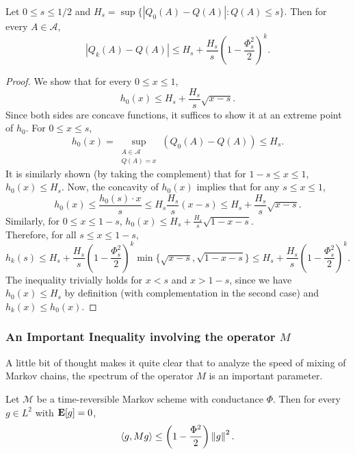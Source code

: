 \begin{corollary}
    Let $0\leq s\leq 1/2$ and $H_s=\sup\{|Q_0(A)-Q(A)|:Q(A)\leq s\}$. Then for every $A\in\mathcal{A}$,
    \[|Q_k(A)-Q(A)| \leq H_s + \frac{H_s}{s}\left(1-\frac{\Phi_s^2}{2}\right)^k. \]
\end{corollary}
\begin{proof}
    We show that for every $0\leq x\leq 1$,
    \[ h_0(x) \leq H_s + \frac{H_s}{s}\sqrt{x-s}. \]
    Since both sides are concave functions, it suffices to show it at an extreme point of $h_0$. For $0\leq x\leq s$,
    \[ h_0(x) = \sup_{\substack{A\in\mathcal{A} \\ Q(A)=x}} (Q_0(A)-Q(A)) \leq H_s. \]
    It is similarly shown (by taking the complement) that for $1-s\leq x\leq 1$, $h_0(x) \leq H_s$. Now, the concavity of $h_0(x)$ implies that for any $s\leq x\leq 1$,
    \[ h_0(x) \leq \frac{h_0(s)\cdot x}{s} \leq H_s \frac{H_s}{s}(x-s) \leq H_s + \frac{H_s}{s}\sqrt{x-s}. \]
    Similarly, for $0\leq x\leq 1-s$, $h_0(x) \leq H_s + \frac{H_s}{s}\sqrt{1-x-s}$.\\
    Therefore, for all $s\leq x\leq 1-s$,
    \[ h_k(s) \leq H_s + \frac{H_s}{s}\left(1-\frac{\Phi_s^2}{2}\right)^k\min\{\sqrt{x-s},\sqrt{1-x-s}\} \leq H_s + \frac{H_s}{s}\left(1-\frac{\Phi_s^2}{2}\right)^k. \]
    The inequality trivially holds for $x<s$ and $x>1-s$, since we have $h_0(x) \leq H_s$ by definition (with complementation in the second case) and $h_k(x) \leq h_0(x)$.
\end{proof}

\subsubsection{An Important Inequality involving the operator \texorpdfstring{$M$}{}}

A little bit of thought makes it quite clear that to analyze the speed of mixing of Markov chains, the spectrum of the operator $M$ is an important parameter.

\begin{ftheo}
\label{rapid mixing expec 0}
    Let $\mathcal{M}$ be a time-reversible Markov scheme with conductance $\Phi$. Then for every $g\in L^2$ with $\textbf{E}[g]=0$,
    \[ \langle g,Mg\rangle \leq \left(1-\frac{\Phi^2}{2}\right)\left\lVert g\right\rVert^2. \]
\end{ftheo}

